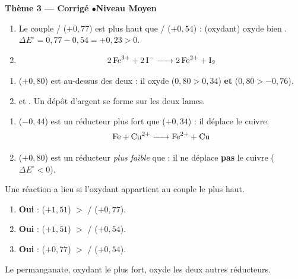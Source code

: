 \documentclass[11pt,a4paper]{article}
\begin{document}
\begin{center}\color{primarydark}\large\bfseries Thème 3 — Corrigé \quad$\bullet$\quad Niveau Moyen\end{center}

\begin{corrige}
\begin{enumerate}[label=\alph*)]
  \item Le couple / ($+0{,}77$) est plus haut que /
        ($+0{,}54$) :  (oxydant) oxyde bien . $\Delta E^{\circ}=0{,}77-0{,}54
        =+0{,}23>0$.
  \item \[\ce{2 Fe^{3+} + 2 I^- -> 2 Fe^{2+} + I2}\]
\end{enumerate}
\end{corrige}

\begin{corrige}
\begin{enumerate}[label=\alph*)]
  \item {} ($+0{,}80$) est au-dessus des deux : il oxyde  ($0{,}80>0{,}34$) \textbf{et}
         ($0{,}80>-0{,}76$).
  \item {} \quad et \quad {}.
        Un dépôt d'argent se forme sur les deux lames.
\end{enumerate}
\end{corrige}

\begin{corrige}
\begin{enumerate}[label=\alph*)]
  \item {} ($-0{,}44$) est un réducteur plus fort que  ($+0{,}34$) : il déplace le cuivre.
        \[\ce{Fe + Cu^{2+} -> Fe^{2+} + Cu}\]
  \item {} ($+0{,}80$) est un réducteur \emph{plus faible} que  : il ne déplace
        \textbf{pas} le cuivre ($\Delta E^{\circ}<0$).
\end{enumerate}
\end{corrige}

\begin{corrige}
Une réaction a lieu si l'oxydant appartient au couple le plus haut.
\begin{enumerate}[label=\alph*)]
  \item \textbf{Oui} :  ($+1{,}51$) $>$ / ($+0{,}77$).
  \item \textbf{Oui} :  ($+1{,}51$) $>$ / ($+0{,}54$).
  \item \textbf{Oui} :  ($+0{,}77$) $>$ / ($+0{,}54$).
\end{enumerate}
Le permanganate, oxydant le plus fort, oxyde les deux autres réducteurs.
\end{corrige}
\end{document}
